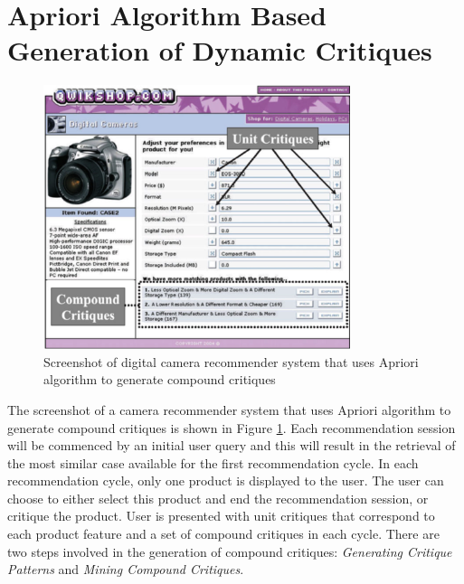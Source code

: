 \section{Apriori Algorithm Based Generation of Dynamic Critiques}
\label{sec:apriori}
\begin{figure}
  \centering
    \includegraphics[width=0.8\textwidth]{figures-bharath/apriori.png}
  \caption{Screenshot of digital camera recommender system that uses Apriori algorithm to generate compound critiques}
\label{fig:apriori}
\end{figure}
The screenshot of a camera recommender system that uses Apriori algorithm to generate compound critiques is shown in Figure \ref{fig:apriori}.
 Each recommendation session will be commenced by an initial user query and this will result in the retrieval of the most similar case available for the first recommendation cycle.
In each recommendation cycle, only one product is displayed to the user.
The user can choose to either select this product and end the recommendation session, or critique the product.
User is presented with unit critiques that correspond to each product feature and a set of compound critiques in each cycle.
There are two steps involved in the generation of compound critiques: \textit{Generating Critique Patterns} and \textit{Mining Compound Critiques}.

